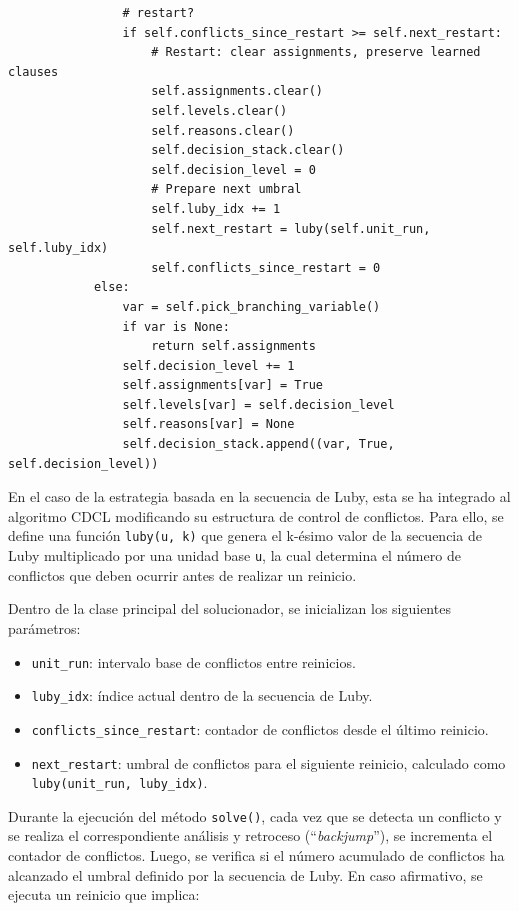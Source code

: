 \begin{lstlisting}
                # restart?
                if self.conflicts_since_restart >= self.next_restart:
                    # Restart: clear assignments, preserve learned clauses
                    self.assignments.clear()
                    self.levels.clear()
                    self.reasons.clear()
                    self.decision_stack.clear()
                    self.decision_level = 0
                    # Prepare next umbral
                    self.luby_idx += 1
                    self.next_restart = luby(self.unit_run, self.luby_idx)
                    self.conflicts_since_restart = 0
            else:
                var = self.pick_branching_variable()
                if var is None:
                    return self.assignments
                self.decision_level += 1
                self.assignments[var] = True
                self.levels[var] = self.decision_level
                self.reasons[var] = None
                self.decision_stack.append((var, True, self.decision_level))
\end{lstlisting}

En el caso de la estrategia basada en la secuencia de Luby, esta se ha integrado al algoritmo CDCL modificando su estructura de control de conflictos. Para ello, se define una funci\'on \texttt{luby(u, k)} que genera el k-\'esimo valor de la secuencia de Luby multiplicado por una unidad base \texttt{u}, la cual determina el n\'umero de conflictos que deben ocurrir antes de realizar un reinicio.

Dentro de la clase principal del solucionador, se inicializan los siguientes parámetros:

\begin{itemize}
    \item \texttt{unit\_run}: intervalo base de conflictos entre reinicios.
    \item \texttt{luby\_idx}: índice actual dentro de la secuencia de Luby.
    \item \texttt{conflicts\_since\_restart}: contador de conflictos desde el último reinicio.
    \item \texttt{next\_restart}: umbral de conflictos para el siguiente reinicio, calculado como \texttt{luby(unit\_run, luby\_idx)}.
\end{itemize}

Durante la ejecución del método \texttt{solve()}, cada vez que se detecta un conflicto y se realiza el correspondiente análisis y retroceso (“\textit{backjump}”), se incrementa el contador de conflictos. Luego, se verifica si el número acumulado de conflictos ha alcanzado el umbral definido por la secuencia de Luby. En caso afirmativo, se ejecuta un reinicio que implica:

